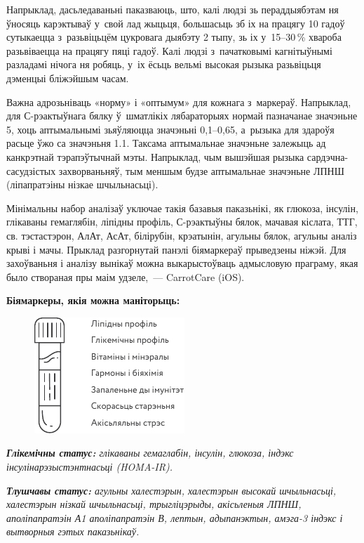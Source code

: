 Напрыклад, дасьледаваньні паказваюць, што, калі людзі зь пераддыябэтам ня ўносяць карэктываў у~свой лад жыцьця, большасьць зб іх на працягу 10 гадоў сутыкаецца з~разьвіцьцём цукровага дыябэту 2 тыпу, зь іх у~15--30\,\% хвароба разьвіваецца на працягу пяці гадоў. Калі людзі з~пачатковымі кагнітыўнымі разладамі нічога ня робяць, у~іх ёсьць вельмі высокая рызыка разьвіцьця дэменцыі бліжэйшым часам.

Важна адрозьніваць «норму» і «оптымум» для кожнага з~маркераў. Напрыклад, для С-рэактыўнага бялку ў~шматлікіх лябараторыях нормай пазначанае значэньне 5, хоць аптымальнымі зьяўляюцца значэньні 0,1--0,65, а~рызыка для здароўя расьце ўжо са значэньня 1.1. Таксама аптымальнае значэньне залежыць ад канкрэтнай тэрапэўтычнай мэты. Напрыклад, чым вышэйшая рызыка сардэчна-сасудзістых захворваньняў, тым меншым будзе аптымальнае значэньне ЛПНШ (ліпапратэіны нізкае шчыльнасьці).

Мінімальны набор аналізаў уключае такія базавыя паказьнікі, як глюкоза, інсулін, глікаваны гемаглябін, ліпідны профіль, С-рэактыўны бялок, мачавая кіслата, ТТГ, св. тэстастэрон, АлАт, АсАт, білірубін, крэатынін, агульны бялок, агульны аналіз крыві і мачы. Прыклад разгорнутай панэлі біямаркераў прыведзены ніжэй. Для захоўваньня і аналізу вынікаў можна выкарыстоўваць адмысловую праграму, якая было створаная пры маім удзеле,~--- CarrotCare (iOS).

\textbf{Біямаркеры, якія можна маніторыць:}

\begin{figure}[htb!]
  \centering
  \includegraphics[scale=1.5]{willpower/ch3/5.pdf}
\end{figure}

\emph{\textbf{Глікемічны статус:} глікаваны гемаглабін, інсулін, глюкоза, індэкс інсулінарэзыстэнтнасьці (HOMA-IR).}

\emph{\textbf{Тлушчавы статус:} агульны халестэрын, халестэрын высокай шчыльнасьці, халестэрын нізкай шчыльнасьці, трыгліцэрыды, акісьленыя ЛПНШ, аполіпапратэін А1 аполіпапратэін В, лептын, адыпанэктын, амэга-3 індэкс і вытворныя гэтых паказьнікаў.}

